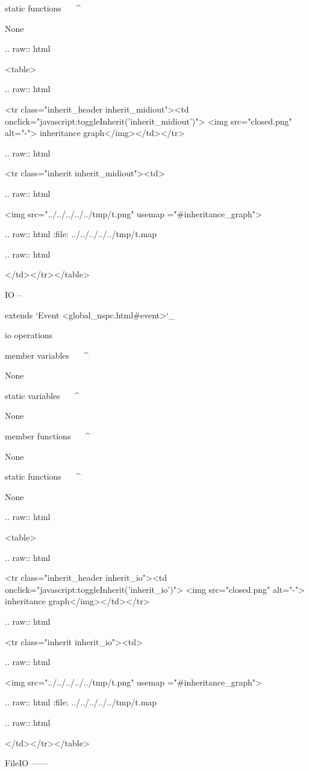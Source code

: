 static functions
^^^^^^^^^^^^^^^^


	None


  .. raw:: html

   <table>


  .. raw:: html

   <tr class="inherit_header inherit_midiout"><td onclick="javascript:toggleInherit('inherit_midiout')"> <img src="closed.png" alt="-"> inheritance graph</img></td></tr>


  .. raw:: html

   <tr class="inherit inherit_midiout"><td>


  .. raw:: html

   <img src="../../../../../tmp/t.png" usemap ="#inheritance_graph">


  .. raw:: html
   :file:   ../../../../../tmp/t.map


  .. raw:: html

   </td></tr></table>

IO
--

extends `Event <global_nspc.html#event>`_ 

io operations

member variables
^^^^^^^^^^^^^^^^

	None

static variables
^^^^^^^^^^^^^^^^

	None

member functions
^^^^^^^^^^^^^^^^


	None

static functions
^^^^^^^^^^^^^^^^


	None


  .. raw:: html

   <table>


  .. raw:: html

   <tr class="inherit_header inherit_io"><td onclick="javascript:toggleInherit('inherit_io')"> <img src="closed.png" alt="-"> inheritance graph</img></td></tr>


  .. raw:: html

   <tr class="inherit inherit_io"><td>


  .. raw:: html

   <img src="../../../../../tmp/t.png" usemap ="#inheritance_graph">


  .. raw:: html
   :file:   ../../../../../tmp/t.map


  .. raw:: html

   </td></tr></table>

FileIO
------

